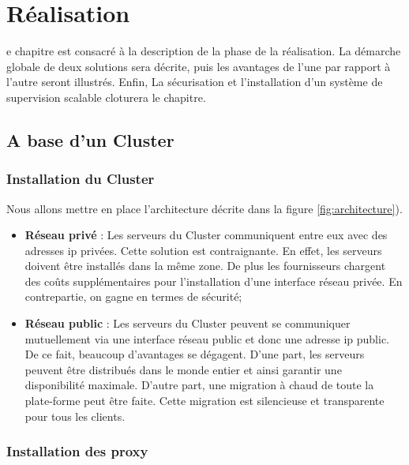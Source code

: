 \chapter{Réalisation}
\begin{onehalfspace}

e chapitre est consacré à la description de la phase de la réalisation. La démarche globale de deux solutions sera décrite, puis les avantages de l'une par rapport à l'autre seront illustrés. Enfin, La sécurisation et l'installation d'un système de supervision scalable cloturera le chapitre.

\newpage

\section{A base d'un Cluster}

\subsection{Installation du Cluster}

Nous allons mettre en place l'architecture décrite dans la figure \ref{fig:architecture}). 


\begin{itemize}
	\item \textbf{Réseau privé} : Les serveurs du Cluster communiquent entre eux avec des adresses \acrshort{ip} privées. Cette solution est contraignante. En effet, les serveurs doivent être installés dans la même zone. De plus les fournisseurs chargent des coûts supplémentaires pour l'installation d'une interface réseau privée. En contrepartie, on gagne en termes de sécurité;
	\item \textbf{Réseau public} : Les serveurs du Cluster peuvent se communiquer mutuellement via une interface réseau public et donc une adresse \acrshort{ip} public. De ce fait, beaucoup d'avantages se dégagent. D'une part, les serveurs peuvent être distribués dans le monde entier et ainsi garantir une disponibilité maximale. D'autre part, une migration à chaud de toute la plate-forme peut être faite. Cette migration est silencieuse et transparente pour tous les clients.
\end{itemize}

\subsection{Installation des proxy}


\end{onehalfspace}
